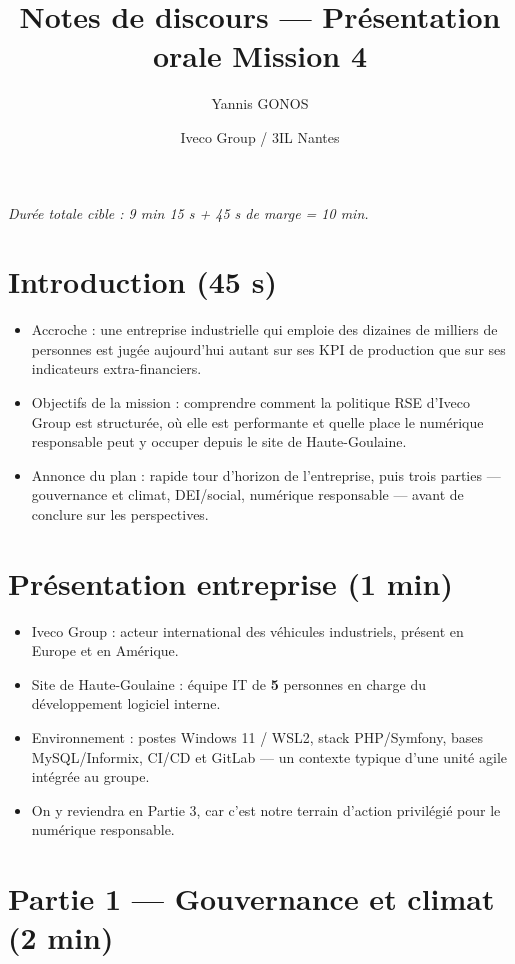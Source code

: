 \documentclass[12pt,a4paper]{article}
\title{Notes de discours --- Présentation orale Mission 4}
\author{Yannis GONOS}
\date{Iveco Group / 3IL Nantes}
\begin{document}
\maketitle

\noindent\textit{Durée totale cible : 9 min 15 s + 45 s de marge = 10 min.}

\section*{Introduction (45 s)}

\begin{itemize}
  \item Accroche : une entreprise industrielle qui emploie des dizaines de milliers de personnes est jugée aujourd'hui autant sur ses KPI de production que sur ses indicateurs extra-financiers.
  \item Objectifs de la mission : comprendre comment la politique RSE d'Iveco Group est structurée, où elle est performante et quelle place le numérique responsable peut y occuper depuis le site de Haute-Goulaine.
  \item Annonce du plan : rapide tour d'horizon de l'entreprise, puis trois parties --- gouvernance et climat, DEI/social, numérique responsable --- avant de conclure sur les perspectives.
\end{itemize}

\section*{Présentation entreprise (1 min)}

\begin{itemize}
  \item Iveco Group : acteur international des véhicules industriels, présent en Europe et en Amérique.
  \item Site de Haute-Goulaine : équipe IT de \textbf{5} personnes en charge du développement logiciel interne.
  \item Environnement : postes Windows 11 / WSL2, stack PHP/Symfony, bases MySQL/Informix, CI/CD et GitLab --- un contexte typique d'une unité agile intégrée au groupe.
  \item On y reviendra en Partie 3, car c'est notre terrain d'action privilégié pour le numérique responsable.
\end{itemize}

\section*{Partie 1 --- Gouvernance et climat (2 min)}
\end{document}
